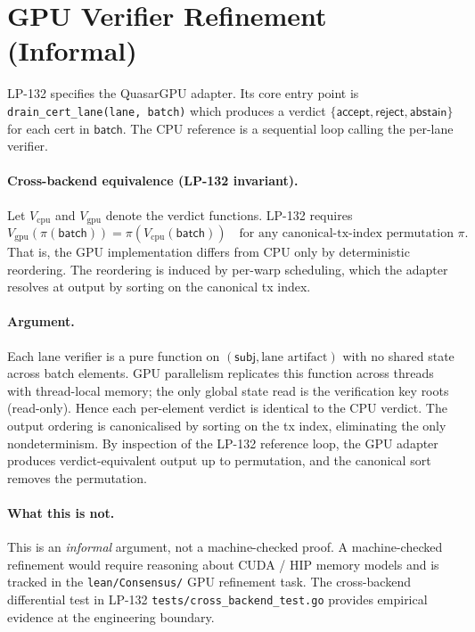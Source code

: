 \documentclass[11pt]{article}
\begin{document}
\section{GPU Verifier Refinement (Informal)}
\label{sec:gpu}

LP-132 specifies the QuasarGPU adapter.  Its core entry point is
\texttt{drain\_cert\_lane(lane, batch)} which produces a verdict
$\{\mathsf{accept}, \mathsf{reject}, \mathsf{abstain}\}$ for each cert
in $\mathsf{batch}$.  The CPU reference is a sequential loop calling
the per-lane verifier.

\paragraph{Cross-backend equivalence (LP-132 invariant).}
Let $V_{\mathrm{cpu}}$ and $V_{\mathrm{gpu}}$ denote the verdict
functions.  LP-132 requires
\[
  V_{\mathrm{gpu}}(\pi(\mathsf{batch})) = \pi(V_{\mathrm{cpu}}(\mathsf{batch}))
  \quad\text{for any canonical-tx-index permutation } \pi.
\]
That is, the GPU implementation differs from CPU only by deterministic
reordering.  The reordering is induced by per-warp scheduling, which
the adapter resolves at output by sorting on the canonical tx index.

\paragraph{Argument.}
Each lane verifier is a pure function on
$(\mathsf{subj}, \text{lane artifact})$ with no shared state across
batch elements.  GPU parallelism replicates this function across
threads with thread-local memory; the only global state read is the
verification key roots (read-only).  Hence each per-element verdict is
identical to the CPU verdict.  The output ordering is canonicalised by
sorting on the tx index, eliminating the only nondeterminism.  By
inspection of the LP-132 reference loop, the GPU adapter produces
verdict-equivalent output up to permutation, and the canonical sort
removes the permutation.

\paragraph{What this is not.}
This is an \emph{informal} argument, not a machine-checked proof.  A
machine-checked refinement would require reasoning about CUDA / HIP
memory models and is tracked in the \texttt{lean/Consensus/} GPU
refinement task.  The cross-backend differential test in LP-132
\texttt{tests/cross\_backend\_test.go} provides empirical evidence at
the engineering boundary.
\end{document}
